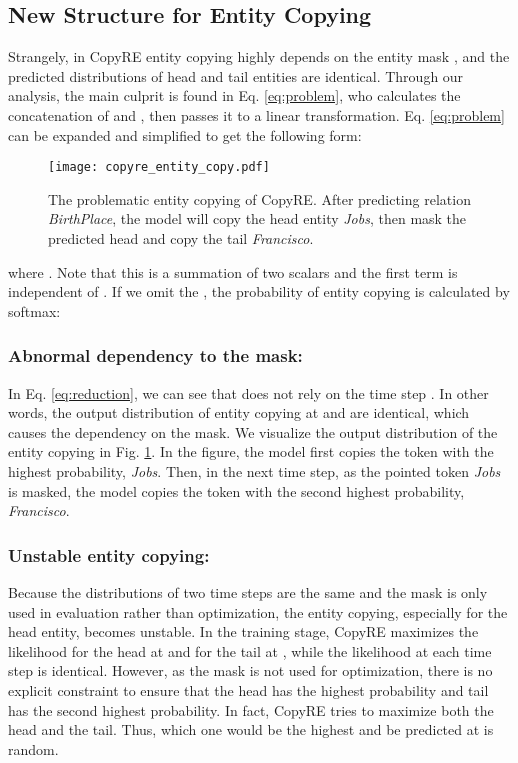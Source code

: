 \documentclass[letterpaper]{article} \usepackage{aaai20}  \usepackage{times}  \usepackage{helvet} \usepackage{courier}  \usepackage[hyphens]{url}  \usepackage{graphicx}
\begin{document}
  
  \subsection{New Structure for Entity Copying}
  Strangely, in CopyRE entity copying highly depends on the entity mask , and the predicted distributions of head and tail entities are identical. 
Through our analysis, the main culprit is found in Eq. \eqref{eq:problem}, who calculates the concatenation of   and , then passes it to a linear transformation.
  Eq. \eqref{eq:problem} can be expanded and simplified to get the following form: 
  \begin{figure}[t]
    \centering
    \texttt{[image: copyre\_entity\_copy.pdf]}
    \caption{The problematic entity copying of CopyRE. After predicting relation \textit{BirthPlace}, the model will copy the head entity \textit{Jobs}, then mask the predicted head and copy the tail \textit{Francisco}.}
  \label{fig:problem}
  \end{figure}

  
  where . 
  Note that this is a summation of two scalars and the first term is independent of . 
  If we omit the , the probability of entity copying is calculated by softmax:
  
  
  
  
      \subsubsection{Abnormal dependency to the mask:}In Eq. \eqref{eq:reduction}, we can see that  does not rely on the time step . 
      In other words, the output distribution of entity copying at  and  are identical, which causes the dependency on the mask. 
      We visualize the output distribution of the entity copying in Fig. \ref{fig:problem}. 
      In the figure, the model first copies the token with the highest probability, \textit{Jobs}. 
      Then, in the next time step, as the pointed token \textit{Jobs} is masked, the model copies the token with the second highest probability, \textit{Francisco}.
      
      \subsubsection{Unstable entity copying:}Because the distributions of two time steps are the same and the mask is only used in evaluation rather than optimization, 
the entity copying, especially for the head entity, becomes unstable. In the training stage, CopyRE maximizes the likelihood for the head at  and for the tail at , while the likelihood at each time step is identical. However, as the mask is not used for optimization, there is no explicit constraint to ensure that the head has the highest probability and tail has the second highest probability. In fact, CopyRE tries to maximize both the head and the tail. Thus, which one would be the highest and be predicted at  is random.
\end{document}
